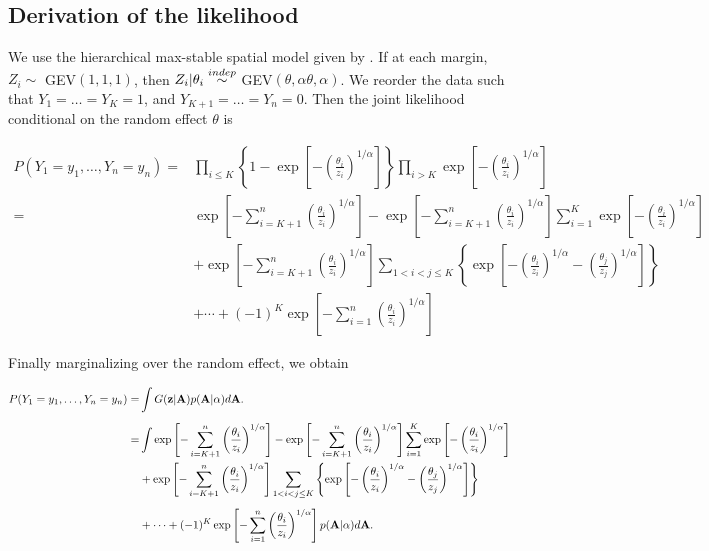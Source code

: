 \documentclass[11pt]{article}
\begin{document}
\subsection{Derivation of the likelihood} \label{a:likelihoodderivation}
We use the hierarchical max-stable spatial model given by \citet{Reich2012}. If at each margin, $Z_i \sim $ GEV$(1,1,1)$, then $Z_i | \theta_i \stackrel{indep}{\sim} $ GEV$(\theta, \alpha \theta, \alpha)$. We reorder the data such that $Y_1=\ldots=Y_K=1$, and $Y_{K+1} = \ldots = Y_n = 0$. Then the joint likelihood conditional on the random effect $\theta$ is

\begin{align} \label{joint_cond}
	P(Y_1=y_1,\ldots,Y_n=y_n) =& \prod_{ i \le K } \left\{ 1 - \exp \left[ - \left( \frac{ \theta_i }{ z_i } \right)^{ 1/\alpha} \right] \right \} \prod_{ i > K } \exp \left[ -\left( \frac{ \theta_i }{ z_i } \right)^{1/\alpha} \right] \nonumber \\[0.5em]
		=& \exp \left[ -\sum_{ i = K+1}^{ n }\left( \frac{ \theta_i }{ z_i } \right)^{1/\alpha} \right] - \exp \left[ -\sum_{ i = K+1}^{ n }\left( \frac{ \theta_i }{ z_i } \right)^{1/\alpha} \right] \sum_{ i = 1}^{K} \exp\left[ -\left( \frac{ \theta_i }{ z_i } \right)^{ 1/\alpha} \right] \nonumber\\
		&  + \exp \left[ -\sum_{ i = K+1}^{ n }\left( \frac{ \theta_i }{ z_i } \right)^{1/\alpha} \right] \sum_{ 1 < i < j \le K } \left\{ \exp \left[ - \left( \frac{ \theta_i }{ z_i } \right)^{ 1/\alpha} - \left( \frac{ \theta_j }{ z_j } \right)^{ 1/\alpha } \right] \right \} \nonumber \\[0.5em]
		& + \cdots + (-1)^K \exp\left[ - \sum_{ i = 1 }^{ n }\left( \frac{ \theta_i }{ z_i } \right)^{ 1/\alpha} \right]
\end{align}

Finally marginalizing over the random effect, we obtain

\begin{align} \label{joint}
    P(Y_1=y_1,\ldots,Y_n=y_n) =&\int G(\mbox{\bf z} | \mbox{\bf A}) p( \mbox{\bf A} | \alpha) d\mbox{\bf A}. \nonumber\\[0.5em]
			=& \int \exp \left[ -\sum_{ i = K+1}^{ n }\left( \frac{ \theta_i }{ z_i } \right)^{1/\alpha} \right] - \exp \left[ -\sum_{ i = K+1}^{ n }\left( \frac{ \theta_i }{ z_i } \right)^{1/\alpha} \right] \sum_{ i = 1}^{K} \exp\left[ -\left( \frac{ \theta_i }{ z_i } \right)^{ 1/\alpha} \right] \nonumber\\
		&  + \exp \left[ -\sum_{ i = K+1}^{ n }\left( \frac{ \theta_i }{ z_i } \right)^{1/\alpha} \right] \sum_{ 1 < i < j \le K } \left\{ \exp \left[ - \left( \frac{ \theta_i }{ z_i } \right)^{ 1/\alpha} - \left( \frac{ \theta_j }{ z_j } \right)^{ 1/\alpha } \right] \right \} \nonumber \\[0.5em]
		& + \cdots + (-1)^K \exp\left[ - \sum_{ i = 1 }^{ n }\left( \frac{ \theta_i }{ z_i } \right)^{ 1/\alpha} \right] p( \mbox{\bf A} | \alpha) d\mbox{\bf A}.
\end{align}
\end{document}
